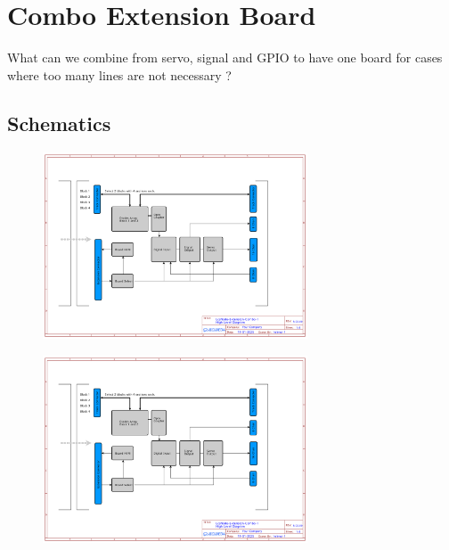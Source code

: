 \chapter{Combo Extension Board}

What can we combine from servo, signal and GPIO to have one board for cases where too many lines are not necessary ?

\section{Schematics}

\begin{figure}[htbp]
    \centering
    \includegraphics[page=1, width=0.7\textwidth]{./Schematics/Schematic_LcsNodes-Extension-Combo-1-Board.pdf}
\end{figure}
\FloatBarrier

\begin{figure}[htbp]
    \centering
    \includegraphics[page=2, width=0.7\textwidth]{./Schematics/Schematic_LcsNodes-Extension-Combo-1-Board.pdf}
\end{figure}
\FloatBarrier

